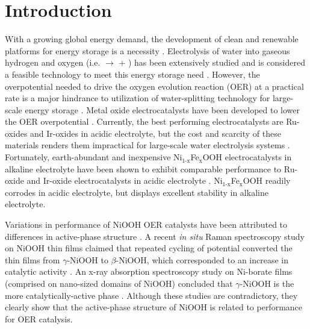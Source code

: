 \documentclass[journal=jpccck,manuscript=article,email=true]{achemso}
\begin{document}
\section{Introduction}
\label{sec-1}
With a growing global energy demand, the development of clean and renewable platforms for energy storage is a necessity \cite{bard-1995-artif-photos,gray-2009-power,cook-2010-solar-energ}. Electrolysis of water into gaseous hydrogen and oxygen (i.e.  $\rightarrow$  + ) has been extensively studied and is considered a feasible technology to meet this energy storage need \cite{dau-2010-mechan-water-oxidat,walter-2010-solar-water,cook-2010-solar-energ}. However, the overpotential needed to drive the oxygen evolution reaction (OER) at a practical rate is a major hindrance to utilization of water-splitting technology for large-scale energy storage \cite{cook-2010-solar-energ}. Metal oxide electrocatalysts have been developed to lower the OER overpotential \cite{dau-2010-mechan-water-oxidat}. Currently, the best performing electrocatalysts are Ru-oxides and Ir-oxides in acidic electrolyte, but the cost and scarcity of these materials renders them impractical for large-scale water electrolysis systems \cite{cook-2010-solar-energ,walter-2010-solar-water,reier-2012-elect-oxygen,mccrory-2013-bench-heter}. Fortunately, earth-abundant and inexpensive Ni$_{\text{1-x}}$Fe$_{\text{x}}$OOH electrocatalysts in alkaline electrolyte have been shown to exhibit comparable performance to Ru-oxide and Ir-oxide electrocatalysts in acidic electrolyte \cite{cook-2010-solar-energ,walter-2010-solar-water,mccrory-2013-bench-heter,smith-2013-water-oxidat-catal,trotochaud-2014-precis}. Ni$_{\text{1-x}}$Fe$_{\text{x}}$OOH readily corrodes in acidic electrolyte, but displays excellent stability in alkaline electrolyte.

Variations in performance of NiOOH OER catalysts have been attributed to differences in active-phase structure \cite{desilvestro-1988-charac-redox,corrigan-1989-elect-spect,yeo-2012-in-situ,bediako-2012-struc-activ}. A recent \emph{in situ} Raman spectroscopy study on NiOOH thin films claimed that repeated cycling of potential converted the thin films from $\gamma$-NiOOH to $\beta$-NiOOH, which corresponded to an increase in catalytic activity  \cite{yeo-2012-in-situ}. An x-ray absorption spectroscopy study on Ni-borate films (comprised on nano-sized domains of NiOOH) concluded that $\gamma$-NiOOH is the more catalytically-active phase \cite{bediako-2012-struc-activ}. Although these studies are contradictory, they clearly show that the active-phase structure of NiOOH is related to performance for OER catalysis.
\end{document}
